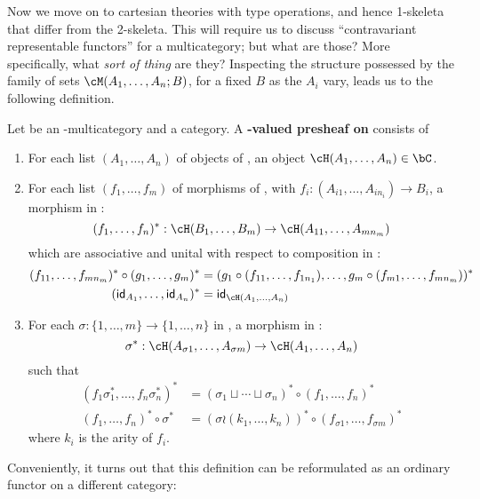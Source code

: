 Now we move on to cartesian theories with type operations, and hence 1-skeleta that differ from the 2-skeleta.
This will require us to discuss ``contravariant representable functors'' for a multicategory; but what are those?
More specifically, what \emph{sort of thing} are they?
Inspecting the structure possessed by the family of sets $\cM(A_1,\dots,A_n;B)$, for a fixed $B$ as the $A_i$ vary, leads us to the following definition.

\begin{defn}\label{defn:multicat-pshf}
  Let \cM be an \fS-multicategory and \bC a category.
  A \textbf{\bC-valued presheaf on \cM} consists of
  \begin{enumerate}
  \item For each list $(A_1,\dots,A_n)$ of objects of \cM, an object $\cH(A_1,\dots,A_n)\in\bC$.
  \item For each list $(f_1,\dots,f_m)$ of morphisms of \cM, with $f_i:(A_{i1},\dots,A_{in_i})\to B_i$, a morphism in \bC:
    \[ (f_1,\dots,f_n)^* : \cH(B_1,\dots,B_m) \to \cH(A_{11},\dots,A_{mn_m}) \]
    which are associative and unital with respect to composition in \cM:
    \begin{align*}
      (f_{11},\dots,f_{mn_m})^* \circ (g_1,\dots,g_m)^* &=
      (g_1\circ (f_{11},\dots,f_{1n_1}), \dots, g_m \circ (f_{m1},\dots,f_{mn_m}))^*
      \\
      (\idfunc_{A_1},\dots,\idfunc_{A_n})^* &= \idfunc_{\cH(A_1,\dots,A_n)}
    \end{align*}
  \item For each $\sigma : \{1,\dots,m\} \to \{1,\dots,n\}$ in \fS, a morphism in \bC:
    \[ \sigma^* : \cH(A_{\sigma 1},\dots,A_{\sigma m}) \to \cH(A_1,\dots,A_n) \]
    such that
    \begin{align*}
      (f_1 \sigma_1^* ,\dots, f_n \sigma_n^*)^* &=
      (\sigma_1\sqcup \cdots \sqcup \sigma_n)^*\circ (f_1,\dots,f_n)^*\\
      (f_1,\dots,f_n)^* \circ \sigma^* &=
      (\sigma \wr (k_1,\dots,k_n))^*\circ(f_{\sigma 1},\dots, f_{\sigma m})^*
    \end{align*}
    where $k_i$ is the arity of $f_i$.
  \end{enumerate}
\end{defn}

Conveniently, it turns out that this definition can be reformulated as an ordinary functor on a different category:

